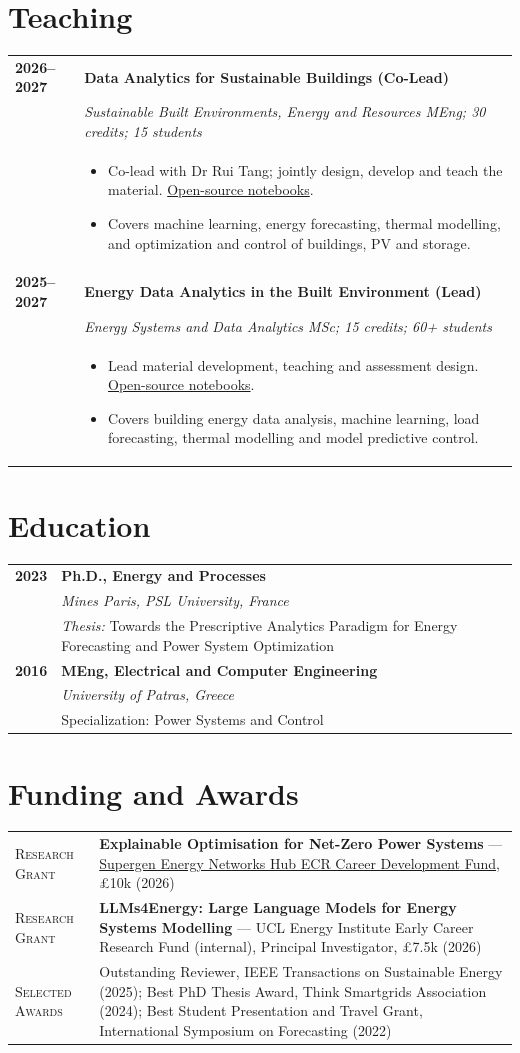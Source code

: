 \documentclass[10pt,a4paper]{article}
\makeatletter
\newlength{\datecolwidth}
\newenvironment{entrylist}{%
  \begin{longtable}{@{}p{\datecolwidth}@{\hspace{0.7em}}p{\dimexpr\linewidth-\datecolwidth-0.7em\relax}@{}}%
}{\end{longtable}}
\newcommand{\entry}[4]{%
  \textbf{#1} & \textbf{#2}\\[-0.25em]
  & {\itshape #3}\\[-0.25em]
  & #4\\[0.35em]
}
\newcommand{\entrylabel}[2]{\textsc{#1} & #2\\[0.4em]}
\makeatother
\begin{document}
\section*{Teaching}
\begin{entrylist}
  \entry{2026--2027}{Data Analytics for Sustainable Buildings (Co-Lead)}{Sustainable Built Environments, Energy and Resources MEng; 30 credits; 15 students}{%
    \begin{itemize}
      \item Co-lead with Dr Rui Tang; jointly design, develop and teach the material. \href{https://github.com/akylasstrat/BENV0169_26-27}{Open-source notebooks}.
      \item Covers machine learning, energy forecasting, thermal modelling, and optimization and control of buildings, PV and storage.
    \end{itemize}}
  \entry{2025--2027}{Energy Data Analytics in the Built Environment (Lead)}{Energy Systems and Data Analytics MSc; 15 credits; 60+ students}{%
    \begin{itemize}
      \item Lead material development, teaching and assessment design. \href{https://github.com/akylasstrat/BENV0092}{Open-source notebooks}.
      \item Covers building energy data analysis, machine learning, load forecasting, thermal modelling and model predictive control.
    \end{itemize}}
\end{entrylist}

\section*{Education}
\begin{entrylist}
  \entry{2023}{Ph.D., Energy and Processes}{Mines Paris, PSL University, France}{\emph{Thesis:} Towards the Prescriptive Analytics Paradigm for Energy Forecasting and Power System Optimization}
  \entry{2016}{MEng, Electrical and Computer Engineering}{University of Patras, Greece}{Specialization: Power Systems and Control}
\end{entrylist}

\newpage
\section*{Funding and Awards}
\begin{entrylist}
  \entrylabel{Research Grant}{\textbf{Explainable Optimisation for Net-Zero Power Systems} --- \href{https://supergenen.org/funding-2-2/}{Supergen Energy Networks Hub ECR Career Development Fund}, \pounds10k (2026)}
  \entrylabel{Research Grant}{\textbf{LLMs4Energy: Large Language Models for Energy Systems Modelling} --- UCL Energy Institute Early Career Research Fund (internal), Principal Investigator, \pounds7.5k (2026)}
  \entrylabel{Selected Awards}{Outstanding Reviewer, IEEE Transactions on Sustainable Energy (2025); Best PhD Thesis Award, Think Smartgrids Association (2024); Best Student Presentation and Travel Grant, International Symposium on Forecasting (2022)}
\end{entrylist}
\end{document}
